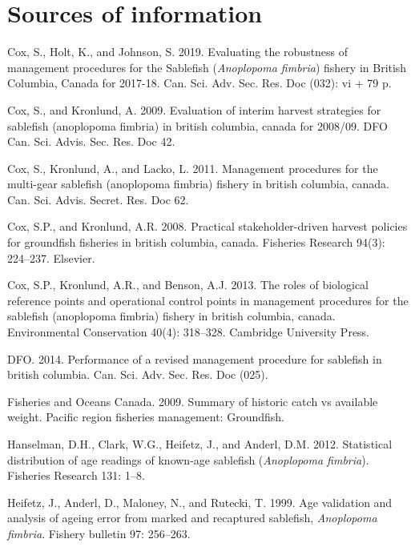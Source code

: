 \documentclass[11pt]{book}
\begin{document}
\hypertarget{sources-of-information}{%
\section{Sources of information}\label{sources-of-information}}

\hypertarget{refs}{}
\leavevmode\hypertarget{ref-cox2019evaluating}{}%
Cox, S., Holt, K., and Johnson, S. 2019. Evaluating the robustness of management procedures for the Sablefish (\emph{Anoplopoma fimbria}) fishery in British Columbia, Canada for 2017-18. Can. Sci. Adv. Sec. Res. Doc (032): vi + 79 p.

\leavevmode\hypertarget{ref-cox2009evaluation}{}%
Cox, S., and Kronlund, A. 2009. Evaluation of interim harvest strategies for sablefish (anoplopoma fimbria) in british columbia, canada for 2008/09. DFO Can. Sci. Advis. Sec. Res. Doc 42.

\leavevmode\hypertarget{ref-cox2011management}{}%
Cox, S., Kronlund, A., and Lacko, L. 2011. Management procedures for the multi-gear sablefish (anoplopoma fimbria) fishery in british columbia, canada. Can. Sci. Advis. Secret. Res. Doc 62.

\leavevmode\hypertarget{ref-cox2008practical}{}%
Cox, S.P., and Kronlund, A.R. 2008. Practical stakeholder-driven harvest policies for groundfish fisheries in british columbia, canada. Fisheries Research 94(3): 224--237. Elsevier.

\leavevmode\hypertarget{ref-cox2013roles}{}%
Cox, S.P., Kronlund, A.R., and Benson, A.J. 2013. The roles of biological reference points and operational control points in management procedures for the sablefish (anoplopoma fimbria) fishery in british columbia, canada. Environmental Conservation 40(4): 318--328. Cambridge University Press.

\leavevmode\hypertarget{ref-dfo2014performanc}{}%
DFO. 2014. Performance of a revised management procedure for sablefish in british columbia. Can. Sci. Adv. Sec. Res. Doc (025).

\leavevmode\hypertarget{ref-DFO2009}{}%
Fisheries and Oceans Canada. 2009. Summary of historic catch vs available weight. Pacific region fisheries management: Groundfish.

\leavevmode\hypertarget{ref-hanselman2012statistical}{}%
Hanselman, D.H., Clark, W.G., Heifetz, J., and Anderl, D.M. 2012. Statistical distribution of age readings of known-age sablefish (\emph{Anoplopoma fimbria}). Fisheries Research 131: 1--8.

\leavevmode\hypertarget{ref-heifetz1999age}{}%
Heifetz, J., Anderl, D., Maloney, N., and Rutecki, T. 1999. Age validation and analysis of ageing error from marked and recaptured sablefish, \emph{Anoplopoma fimbria}. Fishery bulletin 97: 256--263.
\end{document}
